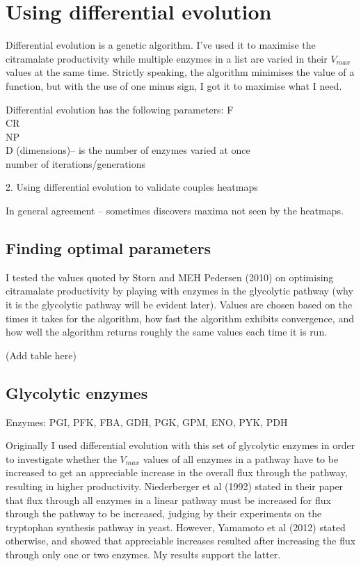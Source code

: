 \documentclass[parskip=full]{scrreprt}
\begin{document}
\section{Using differential evolution}
\label{sec:de}

Differential evolution is a genetic algorithm. I’ve used it to maximise the citramalate productivity while multiple enzymes in a list are varied in their $V_{max}$ values at the same time. Strictly speaking, the algorithm minimises the value of a function, but with the use of one minus sign, I got it to maximise what I need.

Differential evolution has the following parameters:
F\\
CR\\
NP\\
D (dimensions)-- is the number of enzymes varied at once\\
number of iterations/generations

2. Using differential evolution to validate couples heatmaps

In general agreement -- sometimes discovers maxima not seen by the heatmaps.

\subsection{Finding optimal parameters}
\label{ssec:deoptimise}

I tested the values quoted by Storn and MEH Pedersen (2010) on optimising citramalate productivity by playing with enzymes in the glycolytic pathway (why it is the glycolytic pathway will be evident later). Values are chosen based on the times it takes for the algorithm, how fast the algorithm exhibits convergence, and how well the algorithm returns roughly the same values each time it is run.

(Add table here)

\subsection{Glycolytic enzymes}
\label{ssec:glycolytic}

Enzymes: PGI, PFK, FBA, GDH, PGK, GPM, ENO, PYK, PDH

Originally I used differential evolution with this set of glycolytic enzymes in order to investigate whether the $V_{max}$ values of all enzymes in a pathway have to be increased to get an appreciable increase in the overall flux through the pathway, resulting in higher productivity. Niederberger et al (1992) stated in their paper that flux through all enzymes in a linear pathway must be increased for flux through the pathway to be increased, judging by their experiments on the tryptophan synthesis pathway in yeast. However, Yamamoto et al (2012) stated otherwise, and showed that appreciable increases resulted after increasing the flux through only one or two enzymes. My results support the latter.
\end{document}
